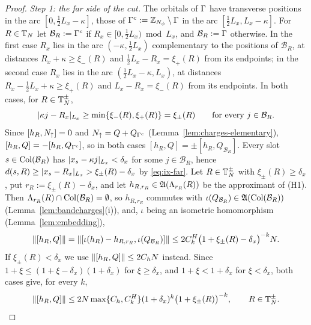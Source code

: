 \begin{proof}
\emph{Step 1: the far side of the cut.} The orbitals of $\Gamma$ have transverse positions in the arc
$[0,\frac12L_x-\kappa]$, those of $\Gamma^c:=\mathbb{Z}_{N_{\phi}}\setminus\Gamma$ in the arc $[\frac12L_x,L_x-\kappa]$. For $R\in\mathbb{T}_N$
let $\mathcal B_R:=\Gamma^c$ if $R_x\in[0,\frac12L_x)\bmod L_x$, and $\mathcal B_R:=\Gamma$ otherwise. In the first case
$R_x$ lies in the arc $(-\kappa,\frac12L_x)$ complementary to the positions of $\mathcal B_R$, at distances
$R_x+\kappa\ge\xi_-(R)$ and $\frac12L_x-R_x=\xi_+(R)$ from its endpoints; in the second case $R_x$ lies in the arc
$(\frac12L_x-\kappa,L_x)$, at distances $R_x-\frac12L_x+\kappa\ge\xi_+(R)$ and $L_x-R_x=\xi_-(R)$ from its endpoints. In
both cases, for $R\in\mathbb{T}_N^\pm$,
\begin{equation}\label{eq:ix-far}
\lvert\kappa j-R_x\rvert_{L_x}\ge\min\{\xi_-(R),\xi_+(R)\}=\xi_\pm(R)\qquad\text{for every }j\in\mathcal B_R .
\end{equation}
Since $[h_R,N_{\uparrow}]=0$ and $N_{\uparrow}=Q+Q_{\Gamma^c}$ (Lemma~\ref{lem:charges-elementary}), $[h_R,Q]=-[h_R,Q_{\Gamma^c}]$, so in both
cases $[h_R,Q]=\pm[h_R,Q_{\mathcal B_R}]$. Every slot $s\in\mathrm{Col}(\mathcal B_R)$ has $\lvert x_s-\kappa j\rvert_{L_x}<\delta_x$ for
some $j\in\mathcal B_R$, hence $d(s,R)\ge\lvert x_s-R_x\rvert_{L_x}>\xi_\pm(R)-\delta_x$ by \eqref{eq:ix-far}. Let $R\in\mathbb{T}_N^\pm$
with $\xi_\pm(R)\ge\delta_x$, put $r_R:=\xi_\pm(R)-\delta_x$, and let $h_{R,r_R}\in\mathfrak{A}(\Lambda_{r_R}(R))$ be the approximant of
(H1). Then $\Lambda_{r_R}(R)\cap\mathrm{Col}(\mathcal B_R)=\emptyset$, so $h_{R,r_R}$ commutes with
$\iota(Q_{\mathcal B_R})\in\mathfrak{A}(\mathrm{Col}(\mathcal B_R))$ (Lemma~\ref{lem:bandcharges}(i)), and, $\iota$ being an isometric
homomorphism (Lemma~\ref{lem:embedding}),
\[
\lVert[h_R,Q]\rVert=\lVert[\iota(h_R)-h_{R,r_R},\iota(Q_{\mathcal B_R})]\rVert\le2C^H_k\bigl(1+\xi_\pm(R)-\delta_x\bigr)^{-k}N .
\]
If $\xi_\pm(R)<\delta_x$ we use $\lVert[h_R,Q]\rVert\le2C_hN$ instead. Since $1+\xi\le(1+\xi-\delta_x)(1+\delta_x)$ for
$\xi\ge\delta_x$, and $1+\xi<1+\delta_x$ for $\xi<\delta_x$, both cases give, for every $k$,
\begin{equation}\label{eq:ix-step1}
\lVert[h_R,Q]\rVert\le2N\max\{C_h,C^H_k\}(1+\delta_x)^k\bigl(1+\xi_\pm(R)\bigr)^{-k},\qquad R\in\mathbb{T}_N^\pm .
\end{equation}


\end{proof}
